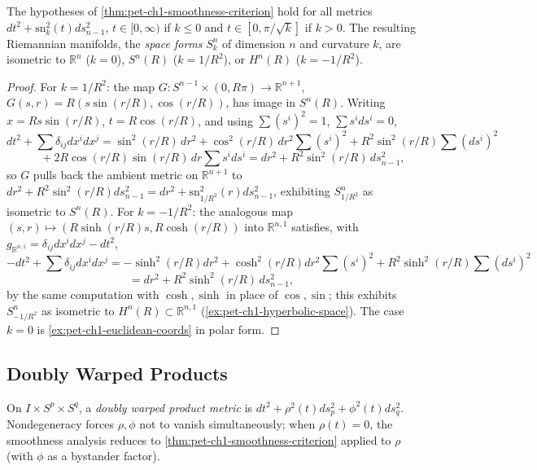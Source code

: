 \begin{example}
  \label{ex:pet-ch1-space-forms}
  \leanok
  The hypotheses of \cref{thm:pet-ch1-smoothness-criterion} hold for all metrics
  $dt^2+\mathrm{sn}_k^2(t)ds_{n-1}^2$, $t\in[0,\infty)$ if $k\le0$ and
  $t\in[0,\pi/\sqrt k]$ if $k>0$. The resulting Riemannian manifolds, the
  \emph{space forms} $S^n_k$ of dimension $n$ and curvature $k$, are isometric to
  $\mathbb{R}^n$ ($k=0$), $S^n(R)$ ($k=1/R^2$), or $H^n(R)$ ($k=-1/R^2$).
\end{example}
\begin{proof}
  \leanok
  For $k=1/R^2$: the map $G:S^{n-1}\times(0,R\pi)\to\mathbb{R}^{n+1}$,
  $G(s,r)=R(s\sin(r/R),\cos(r/R))$, has image in $S^n(R)$. Writing
  $x=Rs\sin(r/R)$, $t=R\cos(r/R)$, and using $\sum(s^i)^2=1$,
  $\sum s^ids^i=0$,
  \[
    dt^2+\sum\delta_{ij}dx^idx^j
    =\sin^2(r/R)\,dr^2+\cos^2(r/R)\,dr^2\sum(s^i)^2+R^2\sin^2(r/R)\sum(ds^i)^2
  \]
  \[
    \qquad+2R\cos(r/R)\sin(r/R)\,dr\sum s^ids^i
    =dr^2+R^2\sin^2(r/R)\,ds_{n-1}^2,
  \]
  so $G$ pulls back the ambient metric on $\mathbb{R}^{n+1}$ to
  $dr^2+R^2\sin^2(r/R)ds_{n-1}^2=dr^2+\mathrm{sn}_{1/R^2}^2(r)ds_{n-1}^2$, exhibiting
  $S^n_{1/R^2}$ as isometric to $S^n(R)$. For $k=-1/R^2$: the analogous map
  $(s,r)\mapsto(R\sinh(r/R)s,R\cosh(r/R))$ into $\mathbb{R}^{n,1}$ satisfies, with
  $g_{\mathbb{R}^{n,1}}=\delta_{ij}dx^idx^j-dt^2$,
  \[
    -dt^2+\sum\delta_{ij}dx^idx^j
    =-\sinh^2(r/R)dr^2+\cosh^2(r/R)dr^2\sum(s^i)^2+R^2\sinh^2(r/R)\sum(ds^i)^2
  \]
  \[
    =dr^2+R^2\sinh^2(r/R)\,ds_{n-1}^2,
  \]
  by the same computation with $\cosh,\sinh$ in place of $\cos,\sin$; this
  exhibits $S^n_{-1/R^2}$ as isometric to $H^n(R)\subset\mathbb{R}^{n,1}$
  (\cref{ex:pet-ch1-hyperbolic-space}). The case $k=0$ is
  \cref{ex:pet-ch1-euclidean-coords} in polar form.
\end{proof}

\subsection{Doubly Warped Products}

\begin{definition}
  \label{def:pet-ch1-doubly-warped}
  \leanok
  On $I\times S^p\times S^q$, a \emph{doubly warped product metric} is
  $dt^2+\rho^2(t)ds_p^2+\phi^2(t)ds_q^2$. Nondegeneracy forces $\rho,\phi$ not to
  vanish simultaneously; when $\rho(t)=0$, the smoothness analysis reduces to
  \cref{thm:pet-ch1-smoothness-criterion} applied to $\rho$ (with $\phi$ as a
  bystander factor).
\end{definition}

